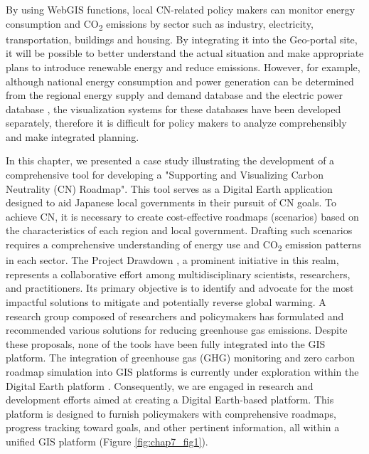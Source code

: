 By using WebGIS functions, local CN-related policy makers can monitor energy consumption and CO\textsubscript{2} emissions by sector such as industry, electricity, transportation, buildings and housing. By integrating it into the Geo-portal site, it will be possible to better understand the actual situation and make appropriate plans to introduce renewable energy and reduce emissions. However, for example, although national energy consumption and power generation can be determined from the regional energy supply and demand database \citep{Toshihiko} and the electric power database \citep{kitamoto, nlftp}, the visualization systems for these databases have been developed separately, therefore it is difficult for policy makers to analyze comprehensibly and make integrated planning.\par

In this chapter, we presented a case study illustrating the development of a comprehensive tool for developing a "Supporting and Visualizing Carbon Neutrality (CN) Roadmap". This tool serves as a Digital Earth application designed to aid Japanese local governments in their pursuit of CN goals. To achieve CN, it is necessary to create cost-effective roadmaps (scenarios) based on the characteristics of each region and local government. Drafting such scenarios requires a comprehensive understanding of energy use and CO\textsubscript{2} emission patterns in each sector. The Project Drawdown \citep{brennan2020project}, a prominent initiative in this realm, represents a collaborative effort among multidisciplinary scientists, researchers, and practitioners. Its primary objective is to identify and advocate for the most impactful solutions to mitigate and potentially reverse global warming. A research group composed of researchers and policymakers has formulated and recommended various solutions for reducing greenhouse gas emissions. Despite these proposals, none of the tools have been fully integrated into the GIS platform. The integration of greenhouse gas (GHG) monitoring and zero carbon roadmap simulation into GIS platforms is currently under exploration within the Digital Earth platform \citep{fukui2021digital}. Consequently, we are engaged in research and development efforts aimed at creating a Digital Earth-based platform. This platform is designed to furnish policymakers with comprehensive roadmaps, progress tracking toward goals, and other pertinent information, all within a unified GIS platform (Figure \ref{fig:chap7_fig1}). \par

